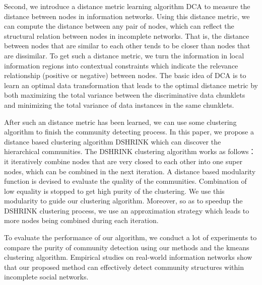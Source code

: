 Second, we introduce a distance metric learning algorithm DCA to measure the 
distance between nodes in information networks. Using this distance metric,
we can compute the distance between any pair of nodes, which can reflect the
structural relation between nodes in incomplete networks. That is,
the distance between nodes that are similar to each other tends to be closer
than nodes that are dissimilar. To get such a distance metric, 
we turn the information in local information regions into 
contextual constraints which indicate the relevance relationship (positive or negative)
between nodes. The basic idea of DCA is to learn an
optimal data transformation that leads to the optimal distance 
metric by both maximizing the total variance between
the discriminative data chunklets and minimizing the total
variance of data instances in the same chunklets.

After such an distance metric has been learned, we can 
use some clustering algorithm to finish the community detecting process. 
In this paper, we propose a distance based clustering algorithm DSHRINK which can discover
the hierarchical communities. The DSHRINK clustering algorithm works as follows：
it iteratively combine nodes that are very closed to each other into one super nodes,
which can be combined in the next iteration. A distance based modularity function is devised
to evaluate the quality of the communities. Combination of low equality is stopped to 
get high purity of the clustering. We use this modularity to guide our clustering algorithm.
Moreover, so as to speedup the DSHRINK clustering process, we use an approximation strategy 
which leads to more nodes being combined during each iteration.

To evaluate the performance of our algorithm, we conduct a lot of experiments to compare
the purity of community detection using our methods and the kmeans clustering algorithm.
Empirical studies on real-world information networks show that our proposed
method can effectively detect community structures within incomplete social networks.

